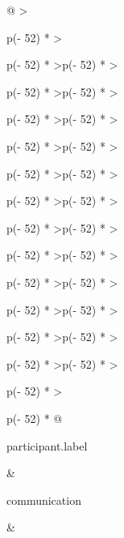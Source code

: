 \documentclass[
  a4paper,
  DIV=11,
  numbers=noendperiod]{scrreprt}
\begin{document}
\begin{longtable}[]{@{}
  >{\raggedright\arraybackslash}p{(\columnwidth - 52\tabcolsep) * }
  >{\raggedright\arraybackslash}p{(\columnwidth - 52\tabcolsep) * }
  >{\raggedleft\arraybackslash}p{(\columnwidth - 52\tabcolsep) * }
  >{\raggedright\arraybackslash}p{(\columnwidth - 52\tabcolsep) * }
  >{\raggedleft\arraybackslash}p{(\columnwidth - 52\tabcolsep) * }
  >{\raggedright\arraybackslash}p{(\columnwidth - 52\tabcolsep) * }
  >{\raggedleft\arraybackslash}p{(\columnwidth - 52\tabcolsep) * }
  >{\raggedright\arraybackslash}p{(\columnwidth - 52\tabcolsep) * }
  >{\raggedleft\arraybackslash}p{(\columnwidth - 52\tabcolsep) * }
  >{\raggedright\arraybackslash}p{(\columnwidth - 52\tabcolsep) * }
  >{\raggedleft\arraybackslash}p{(\columnwidth - 52\tabcolsep) * }
  >{\raggedright\arraybackslash}p{(\columnwidth - 52\tabcolsep) * }
  >{\raggedleft\arraybackslash}p{(\columnwidth - 52\tabcolsep) * }
  >{\raggedright\arraybackslash}p{(\columnwidth - 52\tabcolsep) * }
  >{\raggedleft\arraybackslash}p{(\columnwidth - 52\tabcolsep) * }
  >{\raggedright\arraybackslash}p{(\columnwidth - 52\tabcolsep) * }
  >{\raggedleft\arraybackslash}p{(\columnwidth - 52\tabcolsep) * }
  >{\raggedright\arraybackslash}p{(\columnwidth - 52\tabcolsep) * }
  >{\raggedleft\arraybackslash}p{(\columnwidth - 52\tabcolsep) * }
  >{\raggedright\arraybackslash}p{(\columnwidth - 52\tabcolsep) * }
  >{\raggedleft\arraybackslash}p{(\columnwidth - 52\tabcolsep) * }
  >{\raggedright\arraybackslash}p{(\columnwidth - 52\tabcolsep) * }
  >{\raggedleft\arraybackslash}p{(\columnwidth - 52\tabcolsep) * }
  >{\raggedright\arraybackslash}p{(\columnwidth - 52\tabcolsep) * }
  >{\raggedleft\arraybackslash}p{(\columnwidth - 52\tabcolsep) * }
  >{\raggedright\arraybackslash}p{(\columnwidth - 52\tabcolsep) * }
  >{\raggedright\arraybackslash}p{(\columnwidth - 52\tabcolsep) * }@{}}
\toprule\noalign{}
\begin{minipage}[b]{\linewidth}\raggedright
participant.label
\end{minipage} & \begin{minipage}[b]{\linewidth}\raggedright
communication
\end{minipage} & \begin{minipage}[b]{\linewidth}\raggedleft

\end{minipage}
\end{longtable}
\end{document}
